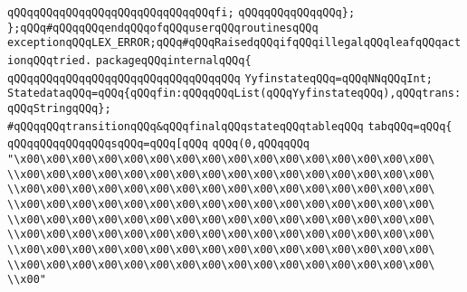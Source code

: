\verb|qQQqqQQqqQQqqQQqqQQqqQQqqQQqqQQqfi;|\newline
\verb|qQQqqQQqqQQqqQQq};|\newline
\newline
\verb|};qQQq#qQQqqQQqendqQQqofqQQquserqQQqroutinesqQQq|\newline
\verb|exceptionqQQqLEX_ERROR;qQQq#qQQqRaisedqQQqifqQQqillegalqQQqleafqQQqactionqQQqtried.|\newline
\verb|packageqQQqinternalqQQq{|\newline
\verb|qQQqqQQqqQQqqQQqqQQqqQQqqQQqqQQqqQQq|\newline
\newline
\verb|YyfinstateqQQq=qQQqNNqQQqInt;|\newline
\verb|StatedataqQQq=qQQq{qQQqfin:qQQqqQQqList(qQQqYyfinstateqQQq),qQQqtrans:qQQqStringqQQq};|\newline
\verb|#qQQqqQQqtransitionqQQq&qQQqfinalqQQqstateqQQqtableqQQq|\newline
\verb|tabqQQq=qQQq{|\newline
\verb|qQQqqQQqqQQqqQQqsqQQq=qQQq[qQQq|\newline
\verb|qQQq(0,qQQqqQQq|\newline
\verb|"\x00\x00\x00\x00\x00\x00\x00\x00\x00\x00\x00\x00\x00\x00\x00\x00\|\newline
\verb|\\x00\x00\x00\x00\x00\x00\x00\x00\x00\x00\x00\x00\x00\x00\x00\x00\|\newline
\verb|\\x00\x00\x00\x00\x00\x00\x00\x00\x00\x00\x00\x00\x00\x00\x00\x00\|\newline
\verb|\\x00\x00\x00\x00\x00\x00\x00\x00\x00\x00\x00\x00\x00\x00\x00\x00\|\newline
\verb|\\x00\x00\x00\x00\x00\x00\x00\x00\x00\x00\x00\x00\x00\x00\x00\x00\|\newline
\verb|\\x00\x00\x00\x00\x00\x00\x00\x00\x00\x00\x00\x00\x00\x00\x00\x00\|\newline
\verb|\\x00\x00\x00\x00\x00\x00\x00\x00\x00\x00\x00\x00\x00\x00\x00\x00\|\newline
\verb|\\x00\x00\x00\x00\x00\x00\x00\x00\x00\x00\x00\x00\x00\x00\x00\x00\|\newline
\verb|\\x00"|\newline
